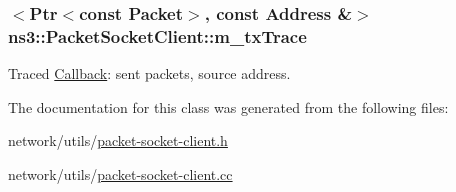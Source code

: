 \subsubsection[{\texorpdfstring{m\+\_\+tx\+Trace}{m_txTrace}}]{$<${\bf Ptr}$<$const {\bf Packet}$>$, const {\bf Address} \&$>$ ns3\+::\+Packet\+Socket\+Client\+::m\+\_\+tx\+Trace\hspace{0.3cm}{\ttfamily [private]}}\hypertarget{classns3_1_1PacketSocketClient_ad771026f2bfd7c6202be47d0f17f9582}{}\label{classns3_1_1PacketSocketClient_ad771026f2bfd7c6202be47d0f17f9582}


Traced \hyperlink{classns3_1_1Callback}{Callback}\+: sent packets, source address. 



The documentation for this class was generated from the following files\+:\begin{DoxyCompactItemize}
\item 
network/utils/\hyperlink{packet-socket-client_8h}{packet-\/socket-\/client.\+h}\item 
network/utils/\hyperlink{packet-socket-client_8cc}{packet-\/socket-\/client.\+cc}\end{DoxyCompactItemize}
